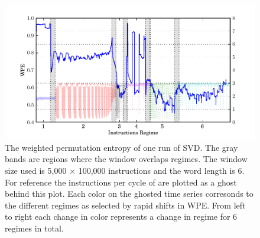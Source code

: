 \begin{figure}[htbp]
  \centering

    \includegraphics[width=\columnwidth]{figs/SVD_wwpe}
  \caption{The weighted permutation entropy of one run of
  SVD. The gray bands are regions where the window overlaps
  regimes. The window size used is 5,000 $\times$ 100,000 instructions
  and the word length is $6$. For reference the instructions per cycle
  of \svd are plotted as a ghost behind this plot. Each color on the
  ghosted time series corresonds to the different regimes as selected
  by rapid shifts in WPE. From left to right each change in color
  represents a change in regime for 6 regimes in
  total.}\label{fig:wwpe}
\end{figure}




